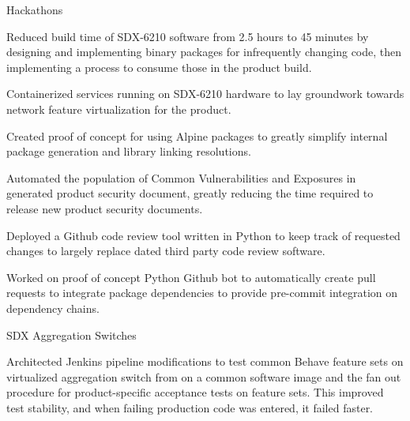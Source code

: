 
\begin{cventries}
  \cventry
    {} {Hackathons} {} {} {
      \begin{cvitems}
        \item {Reduced build time of SDX-6210 software from 2.5 hours to 45 minutes by designing and implementing binary packages for infrequently changing code, then implementing a process to consume those in the product build.}
        \item {Containerized services running on SDX-6210 hardware to lay groundwork towards network feature virtualization for the product.}
        \item {Created proof of concept for using Alpine packages to greatly simplify internal package generation and library linking resolutions.}
        \item {Automated the population of Common Vulnerabilities and Exposures in generated product security document, greatly reducing the time required to release new product security documents.}
        \item {Deployed a Github code review tool written in Python to keep track of requested changes to largely replace dated third party code review software.}
        \item {Worked on proof of concept Python Github bot to automatically create pull requests to integrate package dependencies to provide pre-commit integration on dependency chains.}
      \end{cvitems}
    }

  \cventry
    {} {SDX Aggregation Switches} {} {} {
      \begin{cvitems}
        \item {Architected Jenkins pipeline modifications to test common Behave feature sets on virtualized aggregation switch from on a common software image and the fan out procedure for product-specific acceptance tests on feature sets. This improved test stability, and when failing production code was entered, it failed faster.}
      \end{cvitems}
    }


\end{cventries}

